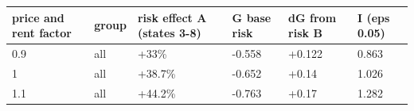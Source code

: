 \begingroup\small
\setlength{\tabcolsep}{3pt}
\renewcommand{\arraystretch}{1.04}
\begin{tabularx}{\linewidth}{XXXXXX}
\toprule
price and rent factor & group & risk effect A (states 3-8) & G base risk & dG from risk B & I (eps 0.05) \\
\midrule
0.9 & all & +33\% & -0.558 & +0.122 & 0.863 \\
1 & all & +38.7\% & -0.652 & +0.14 & 1.026 \\
1.1 & all & +44.2\% & -0.763 & +0.17 & 1.282 \\
\bottomrule
\end{tabularx}
\endgroup
